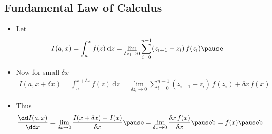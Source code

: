 \begin{slide}
\section[-2]{Fundamental Law of Calculus}

\begin{PauseHighLight}
  \begin{itemize}
  \item Let
    \begin{align*}
      I(a,x) =  \int_a^x f(z) \, \mathrm{d}z =  \lim\limits_{\delta z_i\rightarrow 0} \sum_{i=0}^{n-1}
          (z_{i+1} - z_i) \, f(z_i)\pause
    \end{align*}
  \item Now for small $\delta x$
    \begin{align*}
      I(a,x+\delta x) =  \int_a^{x+\delta x} f(z) \, \mathrm{d}z
      =  \lim\limits_{\delta z_i\rightarrow 0} \sum_{i=0}^{n-1}
      (z_{i+1} - z_i) \, f(z_i) + \delta x \, f(x)
    \end{align*}
  \item Thus
    \begin{align*}
      \frac{\dd I(a, x)}{\dd x}
      &= \lim_{\delta x\rightarrow 0} \frac{I(x+\delta x) - I(x)}{\delta x} \pause 
      = \lim_{\delta x\rightarrow 0}\frac{\delta x \, f(x)}{\delta x} \pauseb = f(x)\pauseb
    \end{align*}
   \end{itemize}
\end{PauseHighLight}


\end{slide}


